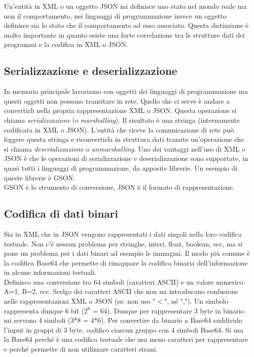 Un'entità in XML o un oggetto JSON mi definisce uno stato nel mondo reale ma non il comportamento, nei linguaggi di programmazione invece un oggetto definisce sia lo stato che il comportamento ad esso associato. 
Questa distinzione è molto importante in quanto esiste una forte correlazione tra le strutture dati dei programmi e la codifica in XML o JSON. 

\subsection{Serializzazione e deserializzazione}
In memoria principale lavoriamo con oggetti dei linguaggi di programmazione ma questi oggetti non possono transitare in rete. Quello che ci serve è andare a convertirli nella propria rappresentazione XML o JSON. Questa operazione si chiama \textit{serializzazione} (o \textit{marshalling}). Il risultato è una stringa (internamente codificata in XML o JSON). L'entità che riceve la comunicazione di rete può leggere questa stringa e
riconvertirla in struttura dati tramite un’operazione che si chiama \textit{deserializzazione} o \textit{unmarshalling}.
Uno dei vantaggi nell'uso di XML o JSON è che le operazioni di serializzazione e deserializzazione sono supportate, in quasi tutti i linguaggi di programmazione, da apposite librerie.
Un esempio di queste librerie è GSON. 
\\ GSON è lo strumento di conversione, JSON è il formato di rappresentazione.

\subsection{Codifica di dati binari}
Sia in XML che in JSON vengono rappresentati i dati singoli nella loro codifica testuale. Non c'è nessun problema per stringhe, interi, float, boolean, ecc, ma si pone un problema per i dati binari ad esempio le immagini.
Il modo più comune è la codifica Base64 che permette di rimappare la codifica binaria dell'informazione in alcune informazioni testuali.
\\ Definisco una conversione tra 64 simboli (caratteri ASCII) e un valore numerico: A=1, B=2, ecc.
Scelgo dei caratteri ASCII che non mi introducano confusione nelle rappresentazioni XML o JSON (es: non uso "$<$", né ",").
Un simbolo rappresenta dunque 6 bit ($2^6$ = 64).
Dunque per rappresentare 3 byte in binario mi servono 4 simboli (3*8 = 4*6).
Per convertire da binario a Base64 suddivido l’input in gruppi di 3 byte, codifico ciascun gruppo con 4 simboli Base64.
Si usa la Base64 perché è una codifica testuale che usa meno caratteri per rappresentare e perché permette di non utilizzare caratteri strani. 

